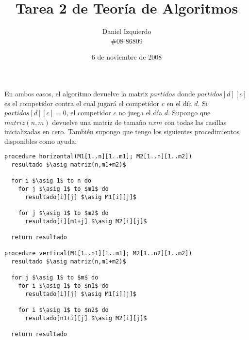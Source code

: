 \documentclass{article}
\newcommand{\asig}{\ensuremath{\leftarrow}}
\begin{document}

\title{Tarea 2 de Teoría de Algoritmos}
\author{Daniel Izquierdo \\ \#08-86809}
\date{6 de noviembre de 2008}

\maketitle

\section{}

\section{}

En ambos casos, el algoritmo
devuelve la matriz $partidos$ donde $partidos[d][c]$
es el competidor contra el cual
jugará el competidor $c$ en el día $d$. Si
$partidos[d][c] = 0$, el competidor $c$ no juega el día $d$. Supongo que
$matriz(n,m)$ devuelve una matriz de tamaño $n x m$ con todas las casillas
inicializadas en cero. También supongo que tengo los siguientes procedimientos disponibles
como ayuda:

\begin{lstlisting}[float,caption={Procedimientos auxiliares para el ejercicio 3},label=alg:aux-ejercicio3]
procedure horizontal(M1[1..n][1..m1]; M2[1..n][1..m2])
  resultado $\asig matriz(n,m1+m2)$

  for i $\asig 1$ to n do
    for j $\asig 1$ to $m1$ do
      resultado[i][j] $\asig M1[i][j]$
 
    for j $\asig 1$ to $m2$ do
      resultado[i][m1+j] $\asig M2[i][j]$

  return resultado

procedure vertical(M1[1..n1][1..m1]; M2[1..n2][1..m2])
  resultado $\asig matriz(n,m1+m2)$

  for j $\asig 1$ to $m$ do
    for i $\asig 1$ to $n1$ do
      resultado[i][j] $\asig M1[i][j]$
 
    for i $\asig 1$ to $n2$ do
      resultado[n1+i][j] $\asig M2[i][j]$

  return resultado
\end{lstlisting}
\end{document}
